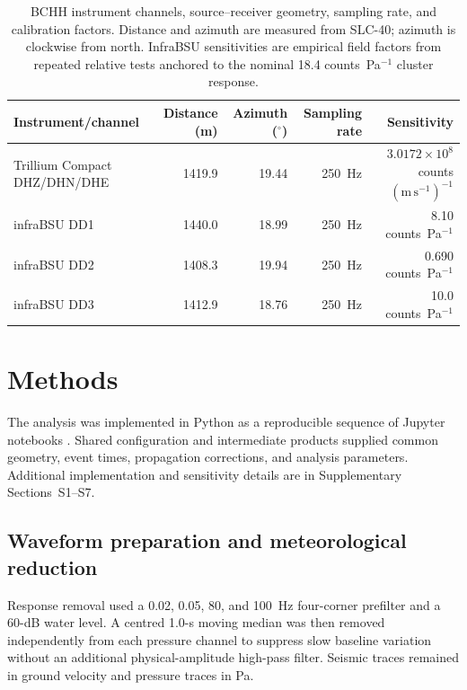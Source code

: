 \documentclass[]{seismica}
\begin{document}
\begin{table}[!tbp]
\centering
\caption{BCHH instrument channels, source--receiver geometry, sampling rate,
and calibration factors. Distance and azimuth are measured from SLC-40;
azimuth is clockwise from north. InfraBSU sensitivities are empirical field
factors from repeated relative tests anchored to the nominal 18.4
counts~Pa$^{-1}$ cluster response.}
\label{tab:instrument_calibration}
\begin{tabular}{lrrrr}
\hline
Instrument/channel & Distance (m) & Azimuth ($^\circ$) & Sampling rate & Sensitivity \\
\hline
Trillium Compact DHZ/DHN/DHE & 1419.9 & 19.44 & 250~Hz
  & $3.0172\times10^8$ counts $(\mathrm{m\,s^{-1}})^{-1}$ \\
infraBSU DD1 & 1440.0 & 18.99 & 250~Hz & 8.10 counts~Pa$^{-1}$ \\
infraBSU DD2 & 1408.3 & 19.94 & 250~Hz & 0.690 counts~Pa$^{-1}$ \\
infraBSU DD3 & 1412.9 & 18.76 & 250~Hz & 10.0 counts~Pa$^{-1}$ \\
\hline
\end{tabular}
\end{table}
\FloatBarrier

\section{Methods}
\label{sec:methods}

The analysis was implemented in Python as a reproducible sequence of Jupyter
notebooks \citep{kluyver2016jupyter}. Shared configuration and intermediate
products supplied common geometry, event times, propagation corrections, and
analysis parameters. Additional implementation and sensitivity details are in
Supplementary Sections~S1--S7.

\subsection{Waveform preparation and meteorological reduction}

Response removal used a 0.02, 0.05, 80, and 100~Hz four-corner prefilter and a
60-dB water level. A centred 1.0-s moving median was then removed independently
from each pressure channel to suppress slow baseline variation without an
additional physical-amplitude high-pass filter. Seismic traces remained in
ground velocity and pressure traces in Pa.
\end{document}
